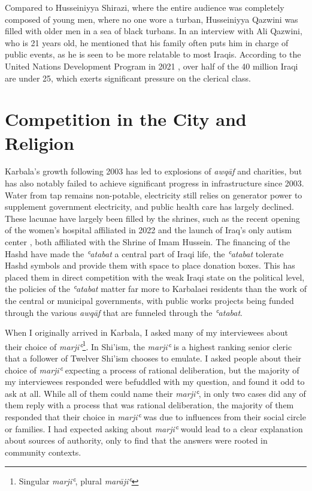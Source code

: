Compared to Husseiniyya Shirazi, where the entire audience was completely composed of young men, where no one wore a turban, Husseiniyya Qazwini was filled with older men in a sea of black turbans. In an interview with Ali Qazwini, who is 21 years old, he mentioned that his family often puts him in charge of public events, as he is seen to be more relatable to most Iraqis. According to the United Nations Development Program in 2021 \cite{undp_youth_2021}, over half of the 40 million Iraqi are under 25, which exerts significant pressure on the clerical class. 

\section{Competition in the City and Religion}
Karbala's growth following 2003 has led to explosions of \emph{awqāf} and charities, but has also notably failed to achieve significant progress in infrastructure since 2003. Water from tap remains non-potable, electricity still relies on generator power to supplement government electricity, and public health care has largely declined. These lacunae have largely been filled by the shrines, such as the recent opening of the women's hospital affiliated in 2022 and the launch of Iraq's only autism center \cite{imam_hussain_holy_shrine_imam_2020}, both affiliated with the Shrine of Imam Hussein. The financing of the Hashd have made the \emph{ʿatabat} a central part of Iraqi life, the \emph{ʿatabat} tolerate Hashd symbols and provide them with space to place donation boxes. This has placed them in direct competition with the weak Iraqi state on the political level, the policies of the \emph{ʿatabat} matter far more to Karbalaei residents than the work of the central or municipal governments, with public works projects being funded through the various \emph{awqāf} that are funneled through the \emph{ʿatabat}. 

When I originally arrived in Karbala, I asked many of my interviewees about their choice of \emph{marjiʿ}\footnote{Singular \emph{marjiʿ}, plural \emph{marājiʿ}}. In Shi'ism, the \emph{marjiʿ} is a highest ranking senior cleric that a follower of Twelver Shi'ism chooses to emulate. I asked people about their choice of \emph{marjiʿ} expecting a process of rational deliberation, but the majority of my interviewees responded were befuddled with my question, and found it odd to ask at all. While all of them could name their \emph{marjiʿ}, in only two cases did any of them reply with a process that was rational deliberation, the majority of them responded that their choice in \emph{marjiʿ} was due to influences from their social circle or families. I had expected asking about \emph{marjiʿ} would lead to a clear explanation about sources of authority, only to find that the answers were rooted in community contexts.

